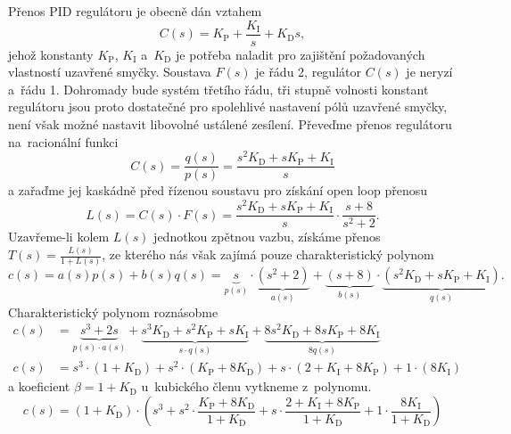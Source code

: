 \documentclass[twoside]{article}
\begin{document}
Přenos PID regulátoru je obecně dán vztahem
\begin{equation}
	C(s) = K_\text{P} + \frac{K_\text{I}}{s} + K_\text{D} s,
\end{equation}
jehož konstanty $K_\text{P}$, $K_\text{I}$ a~$K_\text{D}$ je potřeba naladit pro zajištění požadovaných vlastností uzavřené smyčky.
Soustava $F(s)$ je řádu 2, regulátor $C(s)$ je neryzí a~řádu 1. Dohromady bude systém třetího řádu, tři stupně volnosti
konstant regulátoru jsou proto dostatečné pro spolehlivé nastavení pólů uzavřené smyčky,
není však možné nastavit libovolné ustálené zesílení.
Převeďme přenos regulátoru na~racionální funkci
\begin{equation}
	C(s) = \frac{q(s)}{p(s)} = \frac{s^2 K_\text{D} + s K_\text{P} + K_\text{I}}{s}
\end{equation}
a zařaďme jej kaskádně před řízenou soustavu pro získání open loop přenosu
\begin{equation}
	L(s) = C(s) \cdot F(s) = \frac{s^2 K_\text{D} + s K_\text{P} + K_\text{I}}{s} \cdot \frac{s+8} {s^2 + 2}.
\end{equation}
Uzavřeme-li kolem $L(s)$ jednotkou zpětnou vazbu, získáme přenos $T(s) = \frac{L(s)}{1 + L(s)}$, ze kterého nás však zajímá
pouze charakteristický polynom
\begin{equation}
	c(s) = a(s)p(s) + b(s)q(s) =\underbrace{s}_{p(s)} \cdot \underbrace{(s^2 + 2)}_{a(s)} 
	+ \underbrace{(s+8)}_{b(s)} \cdot \underbrace{(s^2 K_\text{D} + s K_\text{P} + K_\text{I})}_{q(s)}.
\end{equation}
Charakteristický polynom roznásobme
\begin{equation}
	\begin{split}
		c(s) &= \underbrace{s^3 + 2s}_{p(s)\cdot a(s)} + \underbrace{s^3 K_\text{D} + s^2 K_\text{P} + s K_\text{I}}_{s\cdot q(s)} +\underbrace{ 8 s^2 K_\text{D} + 8s K_\text{P} +8 K_\text{I}}_{8 q(s)} \\
		c(s) &= s^3 \cdot (1 + K_\text{D}) + s^2 \cdot(K_\text{P} + 8K_\text{D}) + s \cdot(2 + K_\text{I} + 8K_\text{P}) + 1 \cdot (8K_\text{I})
	\end{split}
\end{equation}
a koeficient $\beta = 1 + K_\text{D}$ u~kubického členu vytkneme z~polynomu.
\begin{equation}
	c(s) = (1 + K_\text{D}) \cdot( s^3 + s^2 \cdot \frac{K_\text{P} + 8K_\text{D}}{1 + K_\text{D}} + s \cdot  \frac{2 + K_\text{I} + 8K_\text{P}}{1 + K_\text{D}} + 1 \cdot \frac{8K_\text{I}}{1 + K_\text{D}})
\end{equation}
\end{document}
